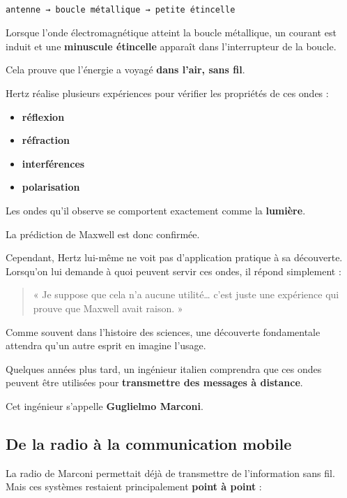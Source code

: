 \documentclass[
  french,
]{article}
\providecommand{\tightlist}{%
  \setlength{\itemsep}{0pt}\setlength{\parskip}{0pt}}
\begin{document}
\begin{verbatim}

antenne → boucle métallique → petite étincelle
\end{verbatim}

Lorsque l'onde électromagnétique atteint la boucle métallique, un
courant est induit et une \textbf{minuscule étincelle} apparaît dans
l'interrupteur de la boucle.

Cela prouve que l'énergie a voyagé \textbf{dans l'air, sans fil}.

Hertz réalise plusieurs expériences pour vérifier les propriétés de ces
ondes :

\begin{itemize}
\tightlist
\item
  \textbf{réflexion}
\item
  \textbf{réfraction}
\item
  \textbf{interférences}
\item
  \textbf{polarisation}
\end{itemize}

Les ondes qu'il observe se comportent exactement comme la
\textbf{lumière}.

La prédiction de Maxwell est donc confirmée.

Cependant, Hertz lui-même ne voit pas d'application pratique à sa
découverte.\\
Lorsqu'on lui demande à quoi peuvent servir ces ondes, il répond
simplement :

\begin{quote}
« Je suppose que cela n'a aucune utilité\ldots{} c'est juste une
expérience qui prouve que Maxwell avait raison. »
\end{quote}

Comme souvent dans l'histoire des sciences, une découverte fondamentale
attendra qu'un autre esprit en imagine l'usage.

Quelques années plus tard, un ingénieur italien comprendra que ces ondes
peuvent être utilisées pour \textbf{transmettre des messages à
distance}.

Cet ingénieur s'appelle \textbf{Guglielmo Marconi}.

\subsection{De la radio à la communication
mobile}\label{de-la-radio-uxe0-la-communication-mobile}

La radio de Marconi permettait déjà de transmettre de l'information sans
fil.\\
Mais ces systèmes restaient principalement \textbf{point à point} :
\end{document}
